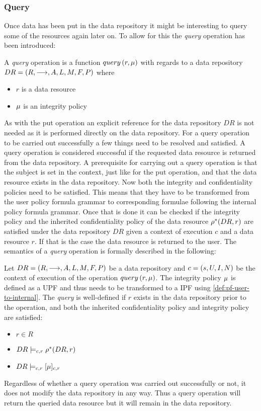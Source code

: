 \subsubsection{Query}\label{sec:query}
Once data has been put in the data repository it might be interesting to query some of the resources again later on. To allow for this the \emph{query} operation has been introduced:
\begin{definition}
A \emph{query} operation is a function $query \left( r, \mu \right)$ with regards to a data repository $DR= \left( R, \longrightarrow, A, L, M, F, P \right)$ where
\begin{itemize}
  \item $r$ is a data resource
  \item $\mu$ is an integrity policy
\end{itemize}
\end{definition}
As with the put operation an explicit reference for the data repository $DR$ is not needed as it is performed directly on the data repository. For a query operation to be carried out successfully a few things need to be resolved and satisfied. A query operation is considered successful if the requested data resource is returned from the data repository. A prerequisite for carrying out a query operation is that the subject is set in the context, just like for the put operation, and that the data resource exists in the data repository. Now both the integrity and confidentiality policies need to be satisfied. This means that they have to be transformed from the user policy formula grammar to corresponding formulae following the internal policy formula grammar. Once that is done it can be checked if the integrity policy and the inherited confidentiality policy of the data resource $\rho^{\ast}(DR,r)$ are satisfied under the data repository $DR$ given a context of execution $c$ and a data resource $r$. If that is the case the data resource is returned to the user.
The semantics of a \emph{query} operation is formally described in the following:
\begin{definition}
Let $DR= \left( R, \longrightarrow, A, L, M, F, P \right)$ be a data repository and $c = \left( s, U, I, N \right)$ be the context of execution of the operation $query \left( r, \mu \right)$. The integrity policy $\mu$ is defined as a UPF and thus needs to be transformed to a IPF using \autoref{def:pf-user-to-internal}.
The \emph{query} is well-defined if $r$ exists in the data repository prior to the operation, and both the inherited confidentiality policy and integrity policy are satisfied:
\begin{itemize}
    \item $r \in R$
    \item $DR \models_{c,r} \rho^{\ast}(DR, r)$
    \item $DR \models_{c,r} [\mu]_{c,r}$
\end{itemize}
\end{definition}

Regardless of whether a query operation was carried out successfully or not, it does not modify the data repository in any way. Thus a query operation will return the queried data resource but it will remain in the data repository. 
